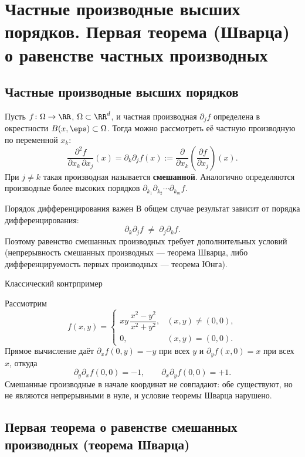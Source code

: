 
\section{Частные производные высших порядков. Первая теорема (Шварца) о равенстве частных производных}

\subsection*{Частные производные высших порядков}

Пусть $f\colon\Omega\to\RR$, $\Omega\subset\RR^d$, и частная производная
$\partial_j f$ определена в окрестности $B(x,\eps)\subset\Omega$. Тогда можно
рассмотреть её частную производную по переменной $x_k$:
\[
\frac{\partial^2 f}{\partial x_k\,\partial x_j}(x)
=\partial_k\partial_j f(x)
:=\frac{\partial}{\partial x_k}\!\left(\frac{\partial f}{\partial x_j}\right)(x).
\]
При $j\ne k$ такая производная называется \textbf{смешанной}. Аналогично определяются
производные более высоких порядков
$\partial_{k_1}\partial_{k_2}\cdots\partial_{k_m} f$.

\begin{Remark}{Порядок дифференцирования важен}{}
	В общем случае результат зависит от порядка дифференцирования:
	\[
	\partial_k\partial_j f \;\ne\; \partial_j\partial_k f.
	\]
	Поэтому равенство смешанных производных требует дополнительных условий
	(непрерывность смешанных производных --- теорема Шварца, либо дифференцируемость
	первых производных --- теорема Юнга).
\end{Remark}

\begin{Example}{Классический контрпример}{}

	Рассмотрим
	\[
	f(x,y)=
	\begin{cases}
		xy\,\dfrac{x^2-y^2}{x^2+y^2}, & (x,y)\ne(0,0),\\[6pt]
		0, & (x,y)=(0,0).
	\end{cases}
	\]
	Прямое вычисление даёт $\partial_x f(0,y)=-y$ при всех $y$ и $\partial_y f(x,0)=x$
	при всех $x$, откуда
	\[
	\partial_y\partial_x f(0,0)=-1,
	\qquad
	\partial_x\partial_y f(0,0)=+1.
	\]
	Смешанные производные в начале координат не совпадают: обе существуют, но не
	являются непрерывными в нуле, и условие теоремы Шварца нарушено.
\end{Example}

\subsection*{Первая теорема о равенстве смешанных производных (теорема Шварца)}

